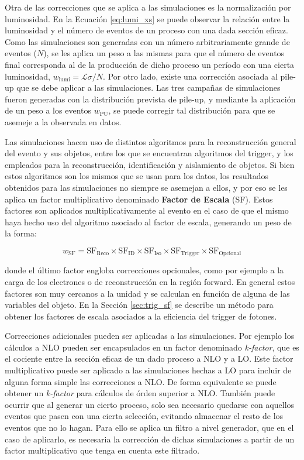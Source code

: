 Otra de las correcciones que se aplica a las simulaciones es la normalización por luminosidad. En la Ecuación \ref{eq:lumi_xs} se puede observar la relación entre la luminosidad y el número de eventos de un proceso con una dada sección eficaz. Como las simulaciones son generadas con un número arbitrariamente grande de eventos ($N$), se les aplica un peso a las mismas para que el número de eventos final corresponda al de la producción de dicho proceso un período con una cierta luminosidad, $w_\text{lumi}=\mathcal{L}\sigma/N$. Por otro lado, existe una corrección asociada al pile-up que se debe aplicar a las simulaciones. Las tres campañas de simulaciones fueron generadas con la distribución prevista de pile-up, y mediante la aplicación de un peso a los eventos $w_\text{PU}$, se puede corregir tal distribución para que se asemeje a la observada en datos.

Las simulaciones hacen uso de distintos algoritmos para la reconstrucción general del evento y sus objetos, entre los que se encuentran algoritmos del trigger, y los empleados para la reconstrucción, identificación y aislamiento de objetos. Si bien estos algoritmos son los mismos que se usan para los datos, los resultados obtenidos para las simulaciones no siempre se asemejan a ellos, y por eso se les aplica un factor multiplicativo denominado \textbf{Factor de Escala} (SF). Estos factores son aplicados multiplicativamente al evento en el caso de que el mismo haya hecho uso del algoritmo asociado al factor de escala, generando un peso de la forma: 

\begin{equation}
  w_{\text{SF}} = \text{SF}_\text{Reco} \times \text{SF}_\text{ID} \times  \text{SF}_\text{Iso} \times  \text{SF}_\text{Trigger} \times  \text{SF}_\text{Opcional}
\end{equation}

\noindent
donde el último factor engloba correcciones opcionales, como por ejemplo a la carga de los electrones o de reconstrucción en la región forward. En general estos factores son muy cercanos a la unidad y se calculan en función de alguna de las variables del objeto. En la Sección \ref{sec:trig_sf} se describe un método para obtener los factores de escala asociados a la eficiencia del trigger de fotones.

Correcciones adicionales pueden ser aplicadas a las simulaciones. Por ejemplo los cálculos a NLO pueden ser encapsulados en un factor denominado \textit{k-factor}, que es el cociente entre la sección eficaz de un dado proceso a NLO y a LO. Este factor multiplicativo puede ser aplicado a las simulaciones hechas a LO para incluir de alguna forma simple las correcciones a NLO. De forma equivalente se puede obtener un \textit{k-factor} para cálculos de órden superior a NLO. También  puede ocurrir que al generar un cierto proceso, solo sea necesario quedarse con aquellos eventos que pasen con una cierta selección, evitando almacenar el resto de los eventos que no lo hagan. Para ello se aplica un filtro a nivel generador, que en el caso de aplicarlo, es necesaria la corrección de dichas simulaciones a partir de un factor multiplicativo que tenga en cuenta este filtrado.

